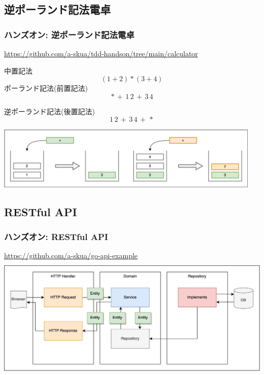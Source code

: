 \documentclass[aspectratio=169]{beamer}
\begin{document}
\subsection{逆ポーランド記法電卓}
\begin{frame}\frametitle{ハンズオン: 逆ポーランド記法電卓}
  {\color{gray} \url{https://github.com/a-skua/tdd-handson/tree/main/calculator}}

  中置記法
  \[ (1 + 2) * (3 + 4) \]
  ポーランド記法(前置記法)
  \[ *\, +\,1\,2\, +\,3\,4 \]

  逆ポーランド記法(後置記法)
  \[ 1\,2\,+\, 3\,4\,+\, * \]

  \includegraphics[height=3cm]{asset/stack.png}
\end{frame}

\subsection{RESTful API}
\begin{frame}\frametitle{ハンズオン: RESTful API}
  {\color{gray} \url{https://github.com/a-skua/go-api-example}}
  \includegraphics[height=6cm]{asset/api.png}
\end{frame}
\end{document}
